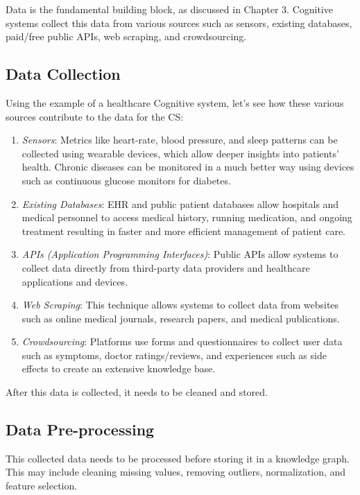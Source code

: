 \documentclass[12pt]{report}
\begin{document}
Data is the fundamental building block, as discussed in Chapter 3. Cognitive
systems collect this data from various sources such as sensors, existing
databases, paid/free public APIs, web scraping, and crowdsourcing.

\subsection{Data Collection}

Using the example of a healthcare Cognitive system, let's see how these various
sources contribute to the data for the CS:

\begin{enumerate}
  \item \textit{Sensors}: Metrics like heart-rate, blood pressure, and sleep
    patterns can be collected using wearable devices, which allow deeper
    insights into patients' health. Chronic diseases can be monitored in a much
    better way using devices such as continuous glucose monitors for diabetes.
  \item \textit{Existing Databases}: EHR and public patient databases allow
    hospitals and medical personnel to access medical history, running
    medication, and ongoing treatment resulting in faster and more efficient
    management of patient care.
  \item \textit{APIs (Application Programming Interfaces)}: Public APIs allow
    systems to collect data directly from third-party data providers and
    healthcare applications and devices.
  \item \textit{Web Scraping}: This technique allows systems to collect data
    from websites such as online medical journals, research papers, and medical
    publications.
  \item \textit{Crowdsourcing}: Platforms use forms and questionnaires to
    collect user data such as symptoms, doctor ratings/reviews, and experiences
    such as side effects to create an extensive knowledge base.
\end{enumerate}

After this data is collected, it needs to be cleaned and stored.

\subsection{Data Pre-processing}

This collected data needs to be processed before storing it in a knowledge
graph. This may include cleaning missing values, removing outliers,
normalization, and feature selection.
\end{document}
